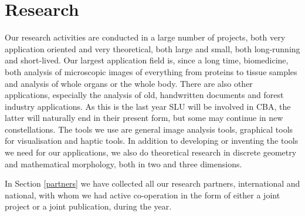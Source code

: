 \documentclass[10pt, a4paper]{article}
\begin{document}
\newcommand{\commentfigure}[1]{}
\newcommand{\researcharea}[1]{\subsection{#1}}

\section{Research}\label{research}
\label{research_proj}
{\large
Our research activities are conducted in a large number of projects, both very application oriented and very theoretical, both large and small, both long-running and short-lived. Our largest application field is, since a long time, biomedicine, both analysis of microscopic images of everything from proteins to tissue samples and analysis of whole organs or the whole body. There are also other applications, especially the analysis of old, handwritten documents and forest industry applications. As this is the last year SLU will be involved in CBA, the latter will naturally end in their present form, but some may continue in new constellations. The tools we use are general image analysis tools, graphical tools for visualisation and haptic tools. In addition to developing or inventing the tools we need for our applications, we also do theoretical research in discrete geometry and mathematical morphology, both in two and three dimensions. 

In Section \ref{partners} we have collected all our research partners, international and national, with whom we had active co-operation in the form of either a joint project or a joint publication, during the year. 


}
\end{document}
